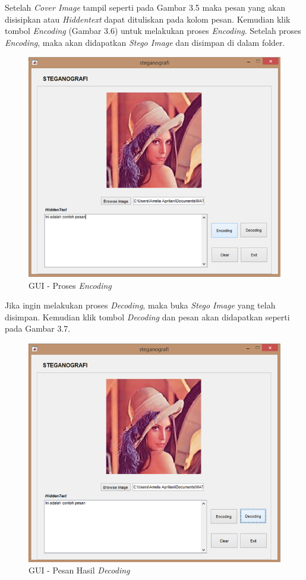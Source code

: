 	Setelah \emph{Cover Image} tampil seperti pada Gambar 3.5 maka pesan yang akan disisipkan atau \emph{Hiddentext} dapat dituliskan pada kolom pesan. Kemudian klik tombol \emph{Encoding} (Gambar 3.6) untuk melakukan proses \emph{Encoding}. Setelah proses \emph{Encoding}, maka akan didapatkan \emph{Stego Image} dan disimpan di dalam folder.
	
	\begin{figure}[H]
		\centering
		\includegraphics[width=1\textwidth]{gambar/mockup/3}
		\caption{GUI - Proses \emph{Encoding}}
		\label{desain_encoding}
	\end{figure}

	Jika ingin melakukan proses \emph{Decoding}, maka buka \emph{Stego Image} yang telah disimpan. Kemudian klik tombol \emph{Decoding} dan pesan akan didapatkan seperti pada Gambar 3.7.

	\begin{figure}[H]
		\centering
		\includegraphics[width=1\textwidth]{gambar/mockup/5}
		\caption{GUI - Pesan Hasil \emph{Decoding}}
		\label{desain_pesan}
	\end{figure}

